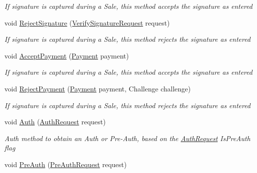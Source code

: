 \begin{DoxyCompactItemize}
\begin{DoxyCompactList}\small\item\em If signature is captured during a Sale, this method accepts the signature as entered \end{DoxyCompactList}\item 
void \hyperlink{interfacecom_1_1clover_1_1remotepay_1_1sdk_1_1_i_clover_connector_a0d7b15309b4113bc8d88c5dd65c351c3}{Reject\+Signature} (\hyperlink{classcom_1_1clover_1_1remotepay_1_1sdk_1_1_verify_signature_request}{Verify\+Signature\+Request} request)
\begin{DoxyCompactList}\small\item\em If signature is captured during a Sale, this method rejects the signature as entered \end{DoxyCompactList}\item 
void \hyperlink{interfacecom_1_1clover_1_1remotepay_1_1sdk_1_1_i_clover_connector_ad6286e6d5ec3157f3ceeafc1de504dff}{Accept\+Payment} (\hyperlink{classcom_1_1clover_1_1sdk_1_1v3_1_1payments_1_1_payment}{Payment} payment)
\begin{DoxyCompactList}\small\item\em If signature is captured during a Sale, this method accepts the signature as entered \end{DoxyCompactList}\item 
void \hyperlink{interfacecom_1_1clover_1_1remotepay_1_1sdk_1_1_i_clover_connector_a6f4a1ae115140ff1cbc8b6d4a8f46be5}{Reject\+Payment} (\hyperlink{classcom_1_1clover_1_1sdk_1_1v3_1_1payments_1_1_payment}{Payment} payment, Challenge challenge)
\begin{DoxyCompactList}\small\item\em If signature is captured during a Sale, this method rejects the signature as entered \end{DoxyCompactList}\item 
void \hyperlink{interfacecom_1_1clover_1_1remotepay_1_1sdk_1_1_i_clover_connector_af0099cbd3075f3c91f6873265f9c766b}{Auth} (\hyperlink{classcom_1_1clover_1_1remotepay_1_1sdk_1_1_auth_request}{Auth\+Request} request)
\begin{DoxyCompactList}\small\item\em Auth method to obtain an Auth or Pre-\/\+Auth, based on the \hyperlink{classcom_1_1clover_1_1remotepay_1_1sdk_1_1_auth_request}{Auth\+Request} Is\+Pre\+Auth flag \end{DoxyCompactList}\item 
void \hyperlink{interfacecom_1_1clover_1_1remotepay_1_1sdk_1_1_i_clover_connector_aa41978ea2b8048ff23ab931752129eb9}{Pre\+Auth} (\hyperlink{classcom_1_1clover_1_1remotepay_1_1sdk_1_1_pre_auth_request}{Pre\+Auth\+Request} request)

\end{DoxyCompactItemize}
